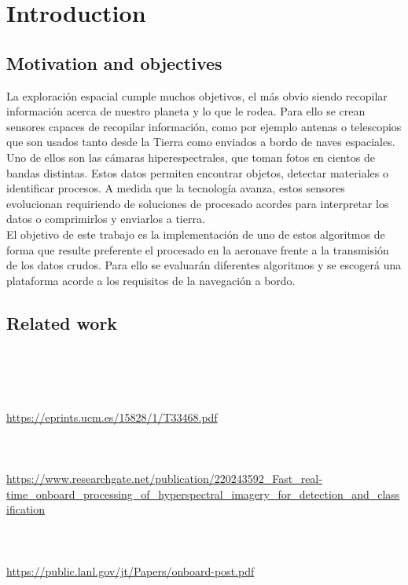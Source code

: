 \cleardoublepage
\chapter{Introduction}
\label{makereference}

\section{Motivation and objectives}

La exploración espacial cumple muchos objetivos, el más obvio siendo recopilar información acerca de nuestro planeta y lo que le rodea. Para ello se crean sensores capaces de recopilar información, como por ejemplo antenas o telescopios que son usados tanto desde la Tierra como enviados a bordo de naves espaciales. Uno de ellos son las cámaras hiperespectrales, que toman fotos en cientos de bandas distintas. Estos datos permiten encontrar objetos, detectar materiales o identificar procesos. A medida que la tecnología avanza, estos sensores evolucionan requiriendo de soluciones de procesado acordes para interpretar los datos o comprimirlos y enviarlos a tierra.
\\
El objetivo de este trabajo es la implementación de uno de estos algoritmos de forma que resulte preferente el procesado en la aeronave frente a la transmisión de los datos crudos. Para ello se evaluarán diferentes algoritmos y se escogerá una plataforma acorde a los requisitos de la navegación a bordo.

\section{Related work}
\\
\\
\\
\\
\url{https://eprints.ucm.es/15828/1/T33468.pdf}
\\
\\
\\
\\
\url{https://www.researchgate.net/publication/220243592_Fast_real-time_onboard_processing_of_hyperspectral_imagery_for_detection_and_classification}
\\
\\
\\
\\
\url{https://public.lanl.gov/jt/Papers/onboard-post.pdf}
\\
\\
\\
\\

